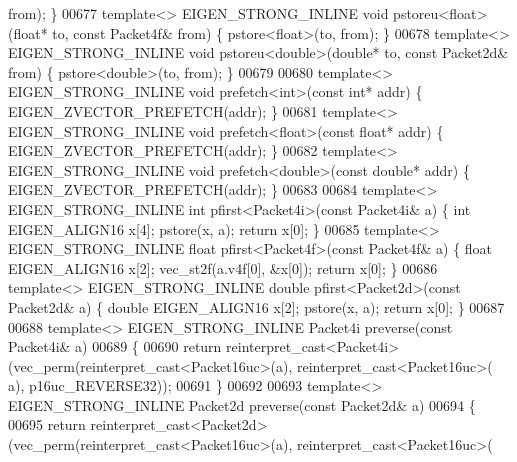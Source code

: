 \begin{DoxyCode}
{      from); \}
00677 \textcolor{keyword}{template}<> EIGEN\_STRONG\_INLINE \textcolor{keywordtype}{void} pstoreu<float>(\textcolor{keywordtype}{float}*    to, \textcolor{keyword}{const} Packet4f& from) \{ pstore<float>(to, 
      from); \}
00678 \textcolor{keyword}{template}<> EIGEN\_STRONG\_INLINE \textcolor{keywordtype}{void} pstoreu<double>(\textcolor{keywordtype}{double}*  to, \textcolor{keyword}{const} Packet2d& from) \{ pstore<double>(to,
       from); \}
00679 
00680 \textcolor{keyword}{template}<> EIGEN\_STRONG\_INLINE \textcolor{keywordtype}{void} prefetch<int>(\textcolor{keyword}{const} \textcolor{keywordtype}{int}*       addr) \{ EIGEN\_ZVECTOR\_PREFETCH(addr); \}
00681 \textcolor{keyword}{template}<> EIGEN\_STRONG\_INLINE \textcolor{keywordtype}{void} prefetch<float>(\textcolor{keyword}{const} \textcolor{keywordtype}{float}*   addr) \{ EIGEN\_ZVECTOR\_PREFETCH(addr); \}
00682 \textcolor{keyword}{template}<> EIGEN\_STRONG\_INLINE \textcolor{keywordtype}{void} prefetch<double>(\textcolor{keyword}{const} \textcolor{keywordtype}{double}* addr) \{ EIGEN\_ZVECTOR\_PREFETCH(addr); \}
00683 
00684 \textcolor{keyword}{template}<> EIGEN\_STRONG\_INLINE \textcolor{keywordtype}{int}    pfirst<Packet4i>(\textcolor{keyword}{const} Packet4i& a) \{ \textcolor{keywordtype}{int}    EIGEN\_ALIGN16 x[4]; 
      pstore(x, a); \textcolor{keywordflow}{return} x[0]; \}
00685 \textcolor{keyword}{template}<> EIGEN\_STRONG\_INLINE \textcolor{keywordtype}{float}  pfirst<Packet4f>(\textcolor{keyword}{const} Packet4f& a) \{ \textcolor{keywordtype}{float}  EIGEN\_ALIGN16 x[2]; 
      vec\_st2f(a.v4f[0], &x[0]); \textcolor{keywordflow}{return} x[0]; \}
00686 \textcolor{keyword}{template}<> EIGEN\_STRONG\_INLINE \textcolor{keywordtype}{double} pfirst<Packet2d>(\textcolor{keyword}{const} Packet2d& a) \{ \textcolor{keywordtype}{double} EIGEN\_ALIGN16 x[2]; 
      pstore(x, a); \textcolor{keywordflow}{return} x[0]; \}
00687 
00688 \textcolor{keyword}{template}<> EIGEN\_STRONG\_INLINE Packet4i preverse(\textcolor{keyword}{const} Packet4i& a)
00689 \{
00690   \textcolor{keywordflow}{return} \textcolor{keyword}{reinterpret\_cast<}Packet4i\textcolor{keyword}{>}(vec\_perm(reinterpret\_cast<Packet16uc>(a), reinterpret\_cast<Packet16uc>(
      a), p16uc\_REVERSE32));
00691 \}
00692 
00693 \textcolor{keyword}{template}<> EIGEN\_STRONG\_INLINE Packet2d preverse(\textcolor{keyword}{const} Packet2d& a)
00694 \{
00695   \textcolor{keywordflow}{return} \textcolor{keyword}{reinterpret\_cast<}Packet2d\textcolor{keyword}{>}(vec\_perm(reinterpret\_cast<Packet16uc>(a), reinterpret\_cast<Packet16uc>(
}
\end{DoxyCode}
